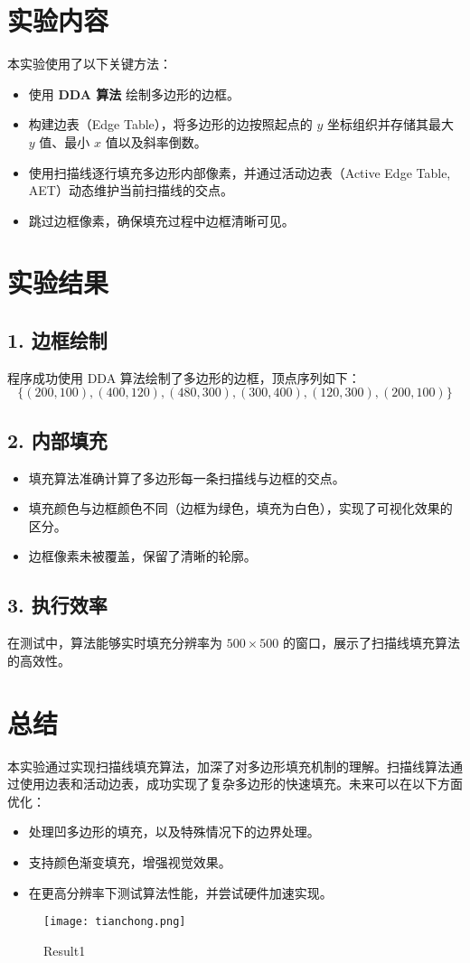 \documentclass[a4paper,12pt]{article}
\begin{document}
\section{实验内容}
本实验使用了以下关键方法：
\begin{itemize}
    \item 使用 \textbf{DDA 算法} 绘制多边形的边框。
    \item 构建边表（Edge Table），将多边形的边按照起点的 $y$ 坐标组织并存储其最大 $y$ 值、最小 $x$ 值以及斜率倒数。
    \item 使用扫描线逐行填充多边形内部像素，并通过活动边表（Active Edge Table, AET）动态维护当前扫描线的交点。
    \item 跳过边框像素，确保填充过程中边框清晰可见。
\end{itemize}

\section{实验结果}
\subsection*{1. 边框绘制}
程序成功使用 DDA 算法绘制了多边形的边框，顶点序列如下：
\[
\{(200, 100), (400, 120), (480, 300), (300, 400), (120, 300), (200, 100)\}
\]

\subsection*{2. 内部填充}
\begin{itemize}
    \item 填充算法准确计算了多边形每一条扫描线与边框的交点。
    \item 填充颜色与边框颜色不同（边框为绿色，填充为白色），实现了可视化效果的区分。
    \item 边框像素未被覆盖，保留了清晰的轮廓。
\end{itemize}

\subsection*{3. 执行效率}
在测试中，算法能够实时填充分辨率为 $500 \times 500$ 的窗口，展示了扫描线填充算法的高效性。

\section*{总结}
本实验通过实现扫描线填充算法，加深了对多边形填充机制的理解。扫描线算法通过使用边表和活动边表，成功实现了复杂多边形的快速填充。未来可以在以下方面优化：
\begin{itemize}
    \item 处理凹多边形的填充，以及特殊情况下的边界处理。
    \item 支持颜色渐变填充，增强视觉效果。
    \item 在更高分辨率下测试算法性能，并尝试硬件加速实现。
\end{itemize}

\begin{figure}
    \centering
    \texttt{[image: tianchong.png]}
    \caption{Result1}
    \label{fig:enter-label}
\end{figure}
\end{document}
